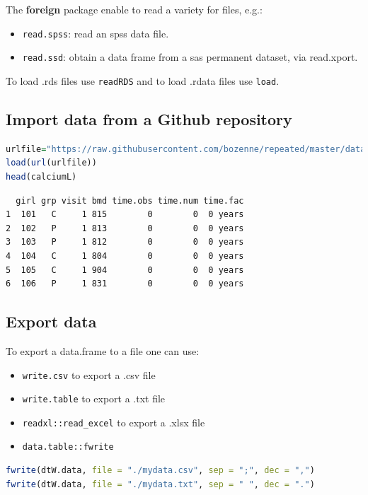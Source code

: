 \documentclass{article}
\begin{document}
\bigskip

The \textbf{foreign} package enable to read a variety for files, e.g.:
\begin{itemize}
\item \texttt{read.spss}: read an spss data file.
\item \texttt{read.ssd}: obtain a data frame from a sas permanent dataset, via read.xport.
\end{itemize}

\bigskip

To load .rds files use \texttt{readRDS} and to load .rdata files use \texttt{load}.
\subsection{Import data from a Github repository}
\label{sec:orgcbd627e}
\begin{lstlisting}[language=r,numbers=none]
urlfile="https://raw.githubusercontent.com/bozenne/repeated/master/data/calciumL.rda"
load(url(urlfile))
head(calciumL)
\end{lstlisting}

\label{}
\begin{verbatim}
  girl grp visit bmd time.obs time.num time.fac
1  101   C     1 815        0        0  0 years
2  102   P     1 813        0        0  0 years
3  103   P     1 812        0        0  0 years
4  104   C     1 804        0        0  0 years
5  105   C     1 904        0        0  0 years
6  106   P     1 831        0        0  0 years
\end{verbatim}
\subsection{Export data}
\label{sec:orgd160660}

To export a data.frame to a file one can use:
\begin{itemize}
\item \texttt{write.csv} to export a .csv file
\item \texttt{write.table} to export a .txt file
\item \texttt{readxl::read\_excel} to export a .xlsx file
\item \texttt{data.table::fwrite}
\end{itemize}
\begin{lstlisting}[language=r,numbers=none]
fwrite(dtW.data, file = "./mydata.csv", sep = ";", dec = ",")
fwrite(dtW.data, file = "./mydata.txt", sep = " ", dec = ".")
\end{lstlisting}
\end{document}
